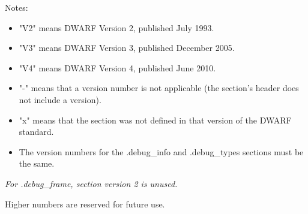 Notes:

\begin{itemize}
\item  "V2" means DWARF Version 2, published July 1993.
\item  "V3" means DWARF Version 3, published December 2005.
\item  "V4" means DWARF Version 4, published June 2010.
\item  "-" means that a version number is not applicable
(the section's header does not include a version).

\item  "x" means that the section was not defined in that
version of the DWARF standard.

\item  The version numbers for the .debug\_info and .debug\_types
sections must be the same.

\end{itemize}

\textit{For .debug\_frame, section version 2 is unused.}

Higher numbers are reserved for future use.

